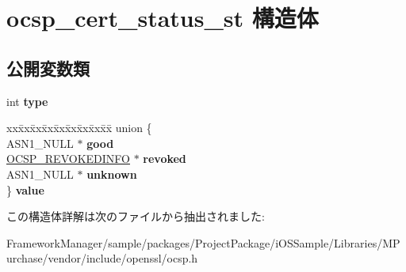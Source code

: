 \hypertarget{structocsp__cert__status__st}{}\section{ocsp\+\_\+cert\+\_\+status\+\_\+st 構造体}
\label{structocsp__cert__status__st}
\subsection*{公開変数類}
\begin{DoxyCompactItemize}
\item 
\hypertarget{structocsp__cert__status__st_a8e834ed8fedd7e6709723625989a2dcf}{}int {\bfseries type}\label{structocsp__cert__status__st_a8e834ed8fedd7e6709723625989a2dcf}

\item 
\hypertarget{structocsp__cert__status__st_ae8984016db119cbffab0e06a9f2d989f}{}\begin{tabbing}
xx\=xx\=xx\=xx\=xx\=xx\=xx\=xx\=xx\=\kill
union \{\\
\>ASN1\_NULL $\ast$ {\bfseries good}\\
\>\hyperlink{structocsp__revoked__info__st}{OCSP\_REVOKEDINFO} $\ast$ {\bfseries revoked}\\
\>ASN1\_NULL $\ast$ {\bfseries unknown}\\
\} {\bfseries value}\label{structocsp__cert__status__st_ae8984016db119cbffab0e06a9f2d989f}
\\

\end{tabbing}\end{DoxyCompactItemize}


この構造体詳解は次のファイルから抽出されました\+:\begin{DoxyCompactItemize}
\item 
Framework\+Manager/sample/packages/\+Project\+Package/i\+O\+S\+Sample/\+Libraries/\+M\+Purchase/vendor/include/openssl/ocsp.\+h\end{DoxyCompactItemize}
